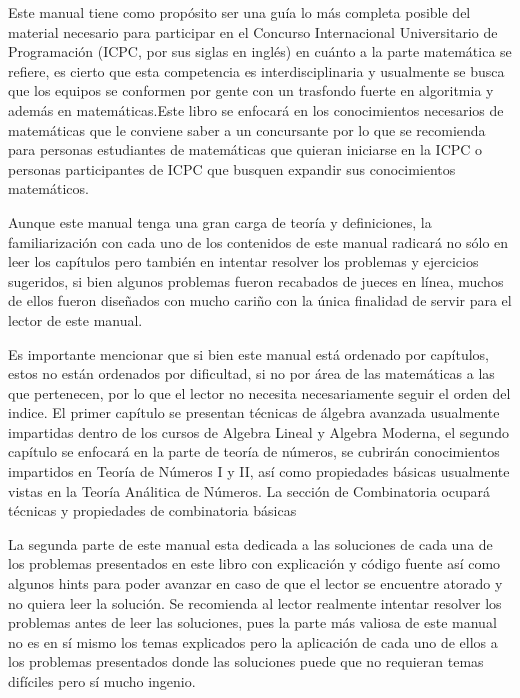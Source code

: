 Este manual tiene como propósito ser una guía lo más completa posible del material necesario para participar en el Concurso Internacional Universitario de Programación (ICPC, por sus siglas en inglés) en cuánto a la parte matemática se refiere, es cierto que esta competencia es interdisciplinaria y usualmente se busca que los equipos se conformen por gente con un trasfondo fuerte en algoritmia y además en matemáticas.Este libro se enfocará en los conocimientos necesarios de matemáticas que le conviene saber a un concursante por lo que se recomienda para personas estudiantes de matemáticas que quieran iniciarse en la ICPC o personas participantes de ICPC que busquen expandir sus conocimientos matemáticos. 

Aunque este manual tenga una gran carga de teoría y definiciones, la familiarización con cada uno de los contenidos de este manual radicará no sólo en leer los capítulos pero también en intentar resolver los problemas y ejercicios sugeridos, si bien algunos problemas fueron recabados de jueces en línea, muchos de ellos fueron diseñados con mucho cariño con la única finalidad de servir para el lector de este manual.

Es importante mencionar que si bien este manual está ordenado por capítulos, estos no están ordenados por dificultad, si no por área de las matemáticas a las que pertenecen, por lo que el lector no necesita necesariamente seguir el orden del indice.
El primer capítulo se presentan técnicas de álgebra avanzada usualmente impartidas dentro de los cursos de Algebra Lineal y Algebra Moderna, el segundo capítulo se enfocará en la parte de teoría de números, se cubrirán conocimientos impartidos en Teoría de Números I y II, así como propiedades básicas usualmente vistas en la Teoría Análitica de Números. La sección de Combinatoria ocupará técnicas y propiedades de combinatoria básicas


La segunda parte de este manual esta dedicada a las soluciones de cada una de los problemas presentados en este libro con explicación y código fuente así como algunos hints para poder avanzar en caso de que el lector se encuentre atorado y no quiera leer la solución. Se recomienda al lector realmente intentar resolver los problemas antes de leer las soluciones, pues la parte más valiosa de este manual no es en sí mismo los temas explicados pero la aplicación de cada uno de ellos a los problemas presentados donde las soluciones puede que no requieran temas difíciles pero sí mucho ingenio.

